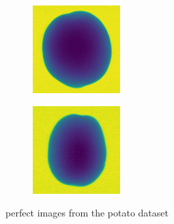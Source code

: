 \documentclass[11pt]{article}
\begin{document}
\begin{figure}[!h]
\begin{subfigure}[b]{0.22\textwidth}
         \caption{}
         \label{fig:perfect_41}
     \end{subfigure}
     \hfill
     \begin{subfigure}[b]{0.22\textwidth}
         \centering
         \includegraphics[width=\textwidth]{figurer/potato_dataset/perfect/perfect_42.jpg}
         \caption{}
         \label{fig:perfect_42}
     \end{subfigure}
     \hfill
     \begin{subfigure}[b]{0.22\textwidth}
         \centering
         \includegraphics[width=\textwidth]{figurer/potato_dataset/perfect/perfect_43.jpg}
         \caption{}
         \label{fig:perfect_43}
     \end{subfigure}
    \caption{perfect images from the potato dataset}
\end{figure}
\end{document}

